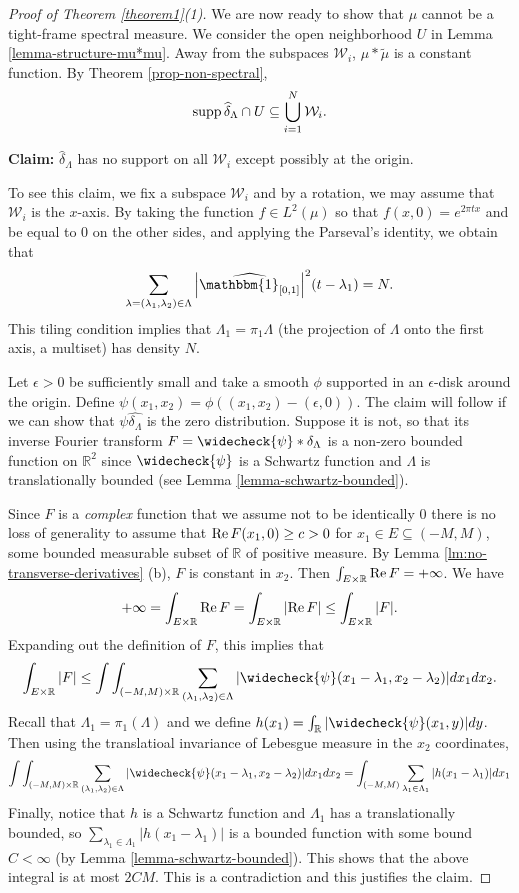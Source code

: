 \documentclass[12pt,a4paper,oneside]{amsart}
\theoremstyle{definition}
\newcommand{\Abs}[1]{{\left|{#1}\right|}}
\newcommand{\RR}{{\mathbb R}}
\newcommand{\one}{{\mathbbm{1}}}
\newcommand{\supp}{{\rm supp\,}}
\newcommand{\ft}[1]{\widehat{#1}}
\newcommand{\tf}[1]{\widecheck{#1}}
\newcommand{\wt}[1]{\widetilde{#1}}
\renewcommand{\Re}{{\rm Re\,}}
\newcounter{rem}
\begin{document}
\begin{proof}[Proof of Theorem \ref{theorem1}(1)]\label{ss:support} We are now ready to show that $\mu$ cannot be a tight-frame spectral measure.  We consider the open neighborhood $U$ in Lemma \ref{lemma-structure-mu*mu}. Away from the subspaces ${\mathcal W}_i$, $\mu\ast\wt\mu$ is a constant function. By Theorem \ref{prop-non-spectral}, 
$$
\supp\ft\delta_\Lambda \cap U \subseteq \bigcup_{i=1}^N{\mathcal W}_i.
$$
\begin{center}
    {\bf Claim:} $\ft\delta_\Lambda$ has no support on all ${\mathcal W}_i$ except possibly at the origin.
\end{center}

To see this claim, we fix a subspace ${\mathcal W}_i$ and by a rotation, we may assume that ${\mathcal W}_i$ is the $x$-axis.  By taking the function $f \in L^2(\mu)$ so that $f(x,0) = e^{2\pi t x}$ and be equal to $0$ on the other sides, and applying the  Parseval's identity,  we obtain that
$$
\sum_{\lambda = (\lambda_1, \lambda_2) \in \Lambda} \Abs{\ft{\one_{[0, 1]}}}^2(t-\lambda_1) = N.
$$
This tiling condition implies that $\Lambda_1 = \pi_1\Lambda$ (the projection of $\Lambda$ onto the first axis, a multiset) has density $N$.


Let $\epsilon>0$ be sufficiently small and take a smooth $\phi$ supported in an $\epsilon$-disk around the origin.
Define $\psi(x_1, x_2) = \phi((x_1, x_2)-(\epsilon, 0))$. The claim will follow if we can show that $\psi \ft{\delta_\Lambda}$ is the zero distribution. Suppose it is not, so that its inverse Fourier transform $F = \tf\psi*\delta_\Lambda$ is a non-zero bounded function on $\RR^2$ since $\tf\psi$ is a Schwartz function and $\Lambda$ is translationally bounded (see Lemma \ref{lemma-schwartz-bounded}).

Since $F$ is a \textit{complex} function that we assume not to be identically 0 there is no loss of generality to assume that
$\Re F(x_1, 0) \ge c > 0$ for $x_1 \in E \subseteq (-M, M)$, some bounded measurable subset of $\RR$ of positive measure. By Lemma \ref{lm:no-transverse-derivatives} (b), $F$ is constant in $x_2$.
 Then $\int_{E \times \RR} \Re F = +\infty$. We have 
$$
+\infty = \int_{E \times \RR} \Re F = \int_{E \times \RR} \Abs{\Re F} \leq \int_{E \times \RR} \Abs{F}.
$$
Expanding out the definition of $F$, this implies that 
$$
\int_{E \times \RR} \Abs{F} \le \int\int_{(-M, M) \times \RR} \sum_{(\lambda_1,\lambda_2)\in \Lambda} |\tf\psi(x_1-\lambda_1,x_2-\lambda_2)|dx_1dx_2.
$$
Recall that $\Lambda_1= \pi_1(\Lambda)$ and we define $h(x_1) = \int_{\RR} |\tf\psi(x_1,y)|dy$. Then using the translatioal invariance of Lebesgue measure in the $x_2$ coordinates, 
$$
\int\int_{(-M, M) \times \RR} \sum_{(\lambda_1,\lambda_2)\in \Lambda} |\tf\psi(x_1-\lambda_1,x_2-\lambda_2)|dx_1dx_2 = \int_{(-M,M)} \sum_{\lambda_1\in\Lambda_1} |h(x_1-\lambda_1)| dx_1
$$
Finally, notice that $h$ is a Schwartz function and $\Lambda_1$ has a translationally bounded, so $\sum_{\lambda_1\in\Lambda_1} |h(x_1-\lambda_1)|$ is a bounded function with some bound $C<\infty$ (by Lemma \ref{lemma-schwartz-bounded}).  This shows that the above integral is at most $2CM$. This is a contradiction and this justifies the claim. 


\end{proof}
\end{document}
